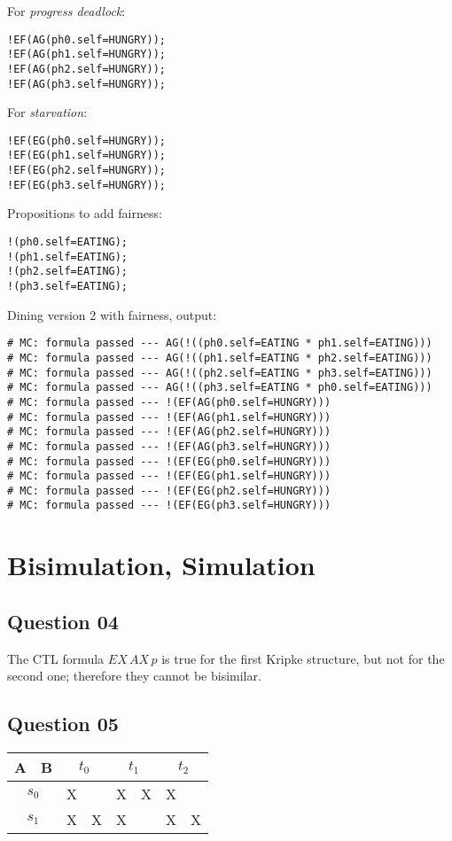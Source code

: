\documentclass[a4paper]{article}
\begin{document}
For \emph{progress deadlock}:
\begin{lstlisting}
!EF(AG(ph0.self=HUNGRY));
!EF(AG(ph1.self=HUNGRY));
!EF(AG(ph2.self=HUNGRY));
!EF(AG(ph3.self=HUNGRY));
\end{lstlisting}

For \emph{starvation}:
\begin{lstlisting}
!EF(EG(ph0.self=HUNGRY));
!EF(EG(ph1.self=HUNGRY));
!EF(EG(ph2.self=HUNGRY));
!EF(EG(ph3.self=HUNGRY));
\end{lstlisting}

Propositions to add fairness:
\begin{lstlisting}
!(ph0.self=EATING);
!(ph1.self=EATING);
!(ph2.self=EATING);
!(ph3.self=EATING);
\end{lstlisting}

Dining version 2 with fairness, output:
\begin{lstlisting}
# MC: formula passed --- AG(!((ph0.self=EATING * ph1.self=EATING)))
# MC: formula passed --- AG(!((ph1.self=EATING * ph2.self=EATING)))
# MC: formula passed --- AG(!((ph2.self=EATING * ph3.self=EATING)))
# MC: formula passed --- AG(!((ph3.self=EATING * ph0.self=EATING)))
# MC: formula passed --- !(EF(AG(ph0.self=HUNGRY)))
# MC: formula passed --- !(EF(AG(ph1.self=HUNGRY)))
# MC: formula passed --- !(EF(AG(ph2.self=HUNGRY)))
# MC: formula passed --- !(EF(AG(ph3.self=HUNGRY)))
# MC: formula passed --- !(EF(EG(ph0.self=HUNGRY)))
# MC: formula passed --- !(EF(EG(ph1.self=HUNGRY)))
# MC: formula passed --- !(EF(EG(ph2.self=HUNGRY)))
# MC: formula passed --- !(EF(EG(ph3.self=HUNGRY)))
\end{lstlisting}

\section*{Bisimulation, Simulation}

\subsection*{Question 04}

The CTL formula $EX\,AX\,p$ is true for the first Kripke structure, but not
for the second one; therefore they cannot be bisimilar.

\subsection*{Question 05}

\begin{center}
\begin{tabular}{ | l | l || l | l | l | l | l | l | }
  \hline
      A & B &
      \multicolumn{2}{c|}{$t_0$} &
      \multicolumn{2}{c|}{$t_1$} &
      \multicolumn{2}{c|}{$t_2$} \\
  \hline
  \hline
      \multicolumn{2}{|c||}{$s_0$}
      & X & & X & X & X & \\
  \hline
      \multicolumn{2}{|c||}{$s_1$}
      & X & X & X & & X & X \\
  \hline
\end{tabular}
\end{center}
\end{document}
